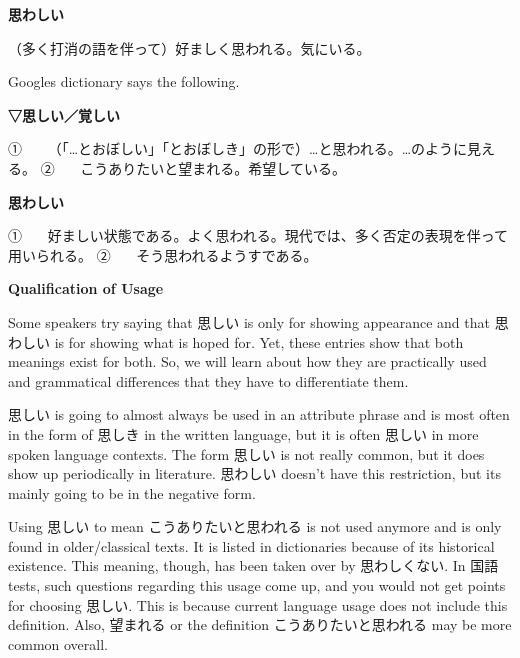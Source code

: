 \par{\textbf{思わしい }}

\par{（多く打消の語を伴って）好ましく思われる。気にいる。 }

\par{ Google\textquotesingle s dictionary says the following. }

\par{\textbf{▽思しい／覚しい }}

\par{①    （「…とおぼしい」「とおぼしき」の形で）…と思われる。…のように見える。 \hfill\break
②    こうありたいと望まれる。希望している。 }

\par{\textbf{思わしい }}

\par{①    好ましい状態である。よく思われる。現代では、多く否定の表現を伴って用いられる。 \hfill\break
②    そう思われるようすである。 }

\begin{center}
 \textbf{Qualification of Usage }
\end{center}

\par{ Some speakers try saying that 思しい is only for showing appearance and that 思わしい is for showing what is hoped for. Yet, these entries show that both meanings exist for both. So, we will learn about how they are practically used and grammatical differences that they have to differentiate them. }

\par{ 思しい is going to almost always be used in an attribute phrase and is most often in the form of 思しき in the written language, but it is often 思しい in more spoken language contexts. The form 思しい is not really common, but it does show up periodically in literature. 思わしい doesn't have this restriction, but it\textquotesingle s mainly going to be in the negative form. }

\par{ Using 思しい to mean こうありたいと思われる is not used anymore and is only found in older\slash classical texts. It is listed in dictionaries because of its historical existence. This meaning, though, has been taken over by 思わしくない. In 国語 tests, such questions regarding this usage come up, and you would not get points for choosing 思しい. This is because current language usage does not include this definition. Also, 望まれる or the definition こうありたいと思われる may be more common overall. }

